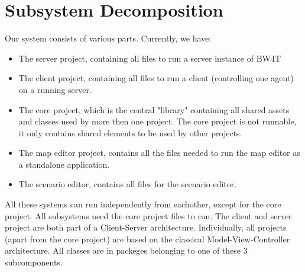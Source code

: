 \section{Subsystem Decomposition}

Our system consists of various parts. Currently, we have:
\begin{itemize}
\item
The server project, containing all files to run a server instance of BW4T
\item
The client project, containing all files to run a client (controlling one agent) on a running server. 
\item
The core project, which is the central "library" containing all shared assets and classes used by more then one project. The core project is not runnable, it only contains shared elements to be used by other projects. 
\item
The map editor project, contains all the files needed to run the map editor as a standalone application.
\item
The scenario editor, contains all files for the scenario editor.
\end{itemize}

All these systems can run independently from eachother, except for the core project. All subsystems need the core project files to run. The client and server project are both part of a Client-Server architecture. Individually, all projects (apart from the core project) are based on the classical Model-View-Controller architecture. All classes are in packeges belonging to one of these 3 subcomponents.  \\

